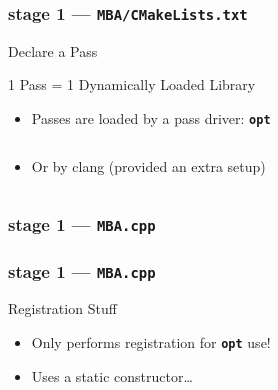 \documentclass[14pt]{beamer}
\newcommand{\Command}[1]{\textbf{\texttt{#1}}}
\begin{document}
    \begin{frame}[containsverbatim]
        \frametitle{stage 1 --- \texttt{MBA/CMakeLists.txt}}
        \begin{block}{Declare a Pass}
            \footnotesize
            
        \end{block}

        \begin{alertblock}{1 Pass = 1 Dynamically Loaded Library}
            \begin{itemize}
                \item Passes are loaded by a pass driver: \textbf{\texttt{opt}}
{
\footnotesize
\begin{lstlisting}[language=bash]
% opt -load LLVMMBA.so -mba input.ll -S
\end{lstlisting}
}
                \item Or by clang (provided an extra setup)
{
\footnotesize
\begin{lstlisting}[language=bash]
% clang -Xclang -load -Xclang LLVMMBA.so input.c -c
\end{lstlisting}
}
            \end{itemize}
        \end{alertblock}

    \end{frame}

    \begin{frame}[containsverbatim]
        \frametitle{stage 1 --- \texttt{MBA.cpp}}
        {
            \footnotesize
            
        }
    \end{frame}


    \begin{frame}[containsverbatim]
        \frametitle{stage 1 --- \texttt{MBA.cpp}}
        \begin{alertblock}{Registration Stuff}
            \begin{itemize}
                \item Only performs registration for \Command{opt} use!
                \item Uses a static constructor\dots
            \end{itemize}
        \end{alertblock}
        {
            \footnotesize
            
        }
    \end{frame}
\end{document}
